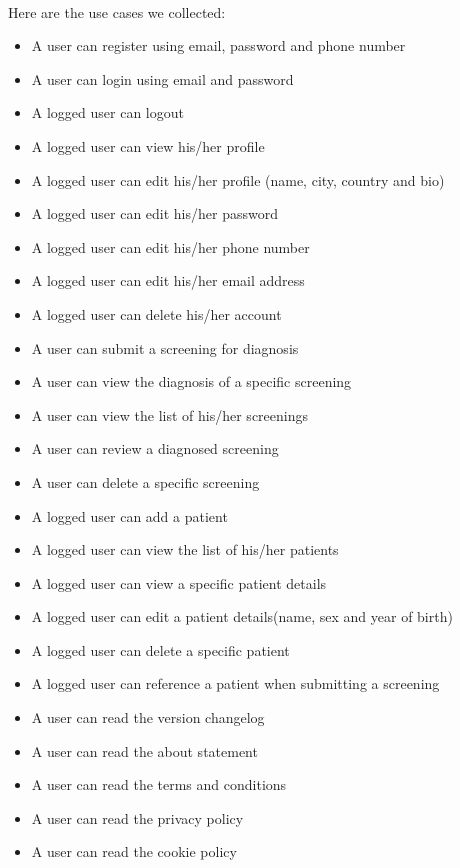 \\
Here are the use cases we collected:

\begin{itemize}
\item
A user can register using email, password and phone number
\item
A user can login using email and password
\item
A logged user can logout
\item
A logged user can view his/her profile
\item
A logged user can edit his/her profile (name, city, country and bio)
\item
A logged user can edit his/her password
\item
A logged user can edit his/her phone number
\item
A logged user can edit his/her email address
\item
A logged user can delete his/her account
\item
A user can submit a screening for diagnosis
\item
A user can view the diagnosis of a specific screening
\item
A user can view the list of his/her screenings
\item
A user can review a diagnosed screening
\item
A user can delete a specific screening
\item
A logged user can add a patient
\item
A logged user can view the list of his/her patients
\item
A logged user can view a specific patient details
\item
A logged user can edit a patient details(name, sex and year of birth)
\item
A logged user can delete a specific patient
\item
A logged user can reference a patient when submitting a screening
\item
A user can read the version changelog
\item
A user can read the about statement
\item
A user can read the terms and conditions
\item
A user can read the privacy policy
\item
A user can read the cookie policy
\end{itemize}